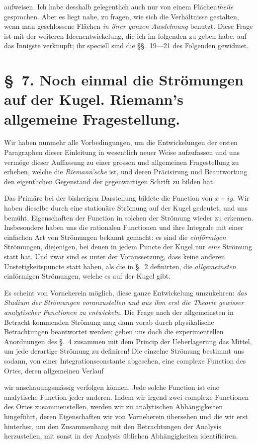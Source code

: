 \documentclass{article}
\begin{document}
aufweisen. Ich habe desshalb gelegentlich auch nur von einem Flächen\emph{theile} gesprochen. Aber es liegt nahe, zu fragen, wie sich die Verhältnisse gestalten, wenn man geschlossene Flächen \emph{in ihrer ganzen Ausdehnung} benutzt. Diese Frage ist mit der weiteren Ideenentwickelung, die ich im folgenden zu geben habe, auf das Innigste verknüpft; ihr speciell sind die §§.~19---21 des Folgenden gewidmet.

\section*{§~7. Noch einmal die Strömungen auf der Kugel. Riemann's allgemeine Fragestellung.}

Wir haben nunmehr alle Vorbedingungen, um die Entwickelungen der ersten Paragraphen dieser Einleitung in wesentlich neuer Weise aufzufassen und uns vermöge dieser Auffassung zu einer grossen und allgemeinen Fragestellung zu erheben, welche die \emph{Riemann'sche} ist, und deren Präcisirung und Beantwortung den eigentlichen Gegenstand der gegenwärtigen Schrift zu bilden hat.

Das Primäre bei der bisherigen Darstellung bildete die Function von $x + iy$. Wir haben dieselbe durch eine stationäre Strömung auf der Kugel gedeutet, und uns bemüht, Eigenschaften der Function in solchen der Strömung wieder zu erkennen. Insbesondere haben uns die rationalen Functionen und ihre Integrale mit einer einfachen Art von Strömungen bekannt gemacht: es sind die \emph{einförmigen} Strömungen, diejenigen, bei denen in jedem Puncte der Kugel nur \emph{eine} Strömung statt hat. Und zwar sind es unter der Voraussetzung, dass keine anderen Unstetigkeitspuncte statt haben, als die in §.~2 definirten, die \emph{allgemeinsten} einförmigen Strömungen, welche es auf der Kugel gibt.

Es scheint von Vorneherein möglich, diese ganze Entwickelung umzukehren: \emph{das Studium der Strömungen voranzustellen und aus ihm erst die Theorie gewisser analytischer Functionen zu entwickeln.} Die Frage nach der allgemeinsten in Betracht kommenden Strömung mag dann vorab durch physikalische Betrachtungen beantwortet werden; geben uns doch die experimentellen Anordnungen des §.~4 zusammen mit dem Princip der Ueberlagerung das Mittel, um jede derartige Strömung zu definiren! Die einzelne Strömung bestimmt uns sodann, von einer Integrationsconstante abgesehen, eine complexe Function des Ortes, deren allgemeinen Verlauf

wir anschauungsmässig verfolgen können. Jede solche Function ist eine analytische Function jeder anderen. Indem wir irgend zwei complexe Functionen des Ortes zusammenstellen, werden wir zu analytischen Abhängigkeiten hingeführt, deren Eigenschaften wir von Vorneherein übersehen und die wir erst hinterher, um den Zusammenhang mit den Betrachtungen der Analysis herzustellen, mit sonst in der Analysis üblichen Abhängigkeiten identificiren.
\end{document}
